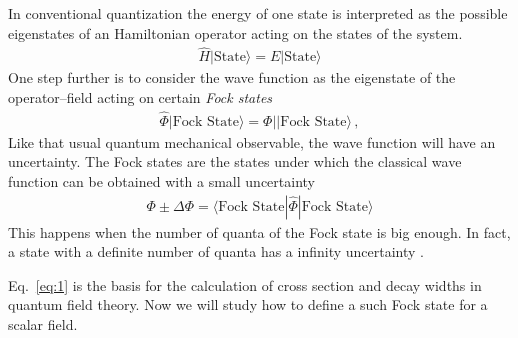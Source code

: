 In conventional quantization the energy of one state is interpreted as the possible eigenstates of an Hamiltonian operator acting on the states of the system. 
\begin{align}
  \widehat{H}|\text{State}\rangle=E|\text{State}\rangle
\end{align}
One step further is to consider the wave function as the eigenstate  of the operator--field acting on certain \emph{Fock states}
\begin{align}
\label{eq:1}
  \widehat{\Phi}|\text{Fock State}\rangle=\Phi||\text{Fock State}\rangle\,,
\end{align}
Like that usual quantum mechanical observable, the wave function will have an uncertainty. 
The Fock states are the states under which the classical wave function can be obtained with a small uncertainty
\begin{align}
    \Phi\pm\Delta\Phi=\langle\text{Fock State}|\widehat{\Phi}|\text{Fock State}\rangle
\end{align}
This happens when the number of quanta of the Fock state is big enough. In fact, a state with a definite number of quanta has a infinity uncertainty \cite{Gross:1993}.

Eq.~\eqref{eq:1} is the basis for the calculation of cross section and decay widths in quantum field theory. Now we will study how to define a such Fock state for a scalar field.


